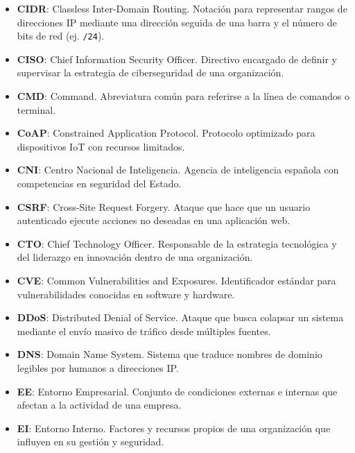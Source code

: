 \documentclass[a4paper, 11pt]{article}
\begin{document}
\begin{itemize}
    \item \textbf{CIDR}: Classless Inter-Domain Routing. Notación para representar rangos de direcciones IP mediante una dirección seguida de una barra y el número de bits de red (ej. \texttt{/24}).

    \item \textbf{CISO}: Chief Information Security Officer. Directivo encargado de definir y supervisar la estrategia de ciberseguridad de una organización.

    \item \textbf{CMD}: Command. Abreviatura común para referirse a la línea de comandos o terminal.

    \item \textbf{CoAP}: Constrained Application Protocol. Protocolo optimizado para dispositivos IoT con recursos limitados.

    \item \textbf{CNI}: Centro Nacional de Inteligencia. Agencia de inteligencia española con competencias en seguridad del Estado.

    \item \textbf{CSRF}: Cross-Site Request Forgery. Ataque que hace que un usuario autenticado ejecute acciones no deseadas en una aplicación web.

    \item \textbf{CTO}: Chief Technology Officer. Responsable de la estrategia tecnológica y del liderazgo en innovación dentro de una organización.

    \item \textbf{CVE}: Common Vulnerabilities and Exposures. Identificador estándar para vulnerabilidades conocidas en software y hardware.

    \item \textbf{DDoS}: Distributed Denial of Service. Ataque que busca colapsar un sistema mediante el envío masivo de tráfico desde múltiples fuentes.

    \item \textbf{DNS}: Domain Name System. Sistema que traduce nombres de dominio legibles por humanos a direcciones IP.

    \item \textbf{EE}: Entorno Empresarial. Conjunto de condiciones externas e internas que afectan a la actividad de una empresa.

    \item \textbf{EI}: Entorno Interno. Factores y recursos propios de una organización que influyen en su gestión y seguridad.


\end{itemize}
\end{document}
